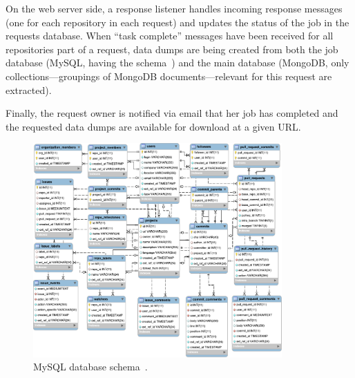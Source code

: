 On the web server side, a response listener handles incoming response messages (one for each repository
in each request)  and updates the status of the job in the requests database.
When ``task complete'' messages have been received for all repositories part of a request, data dumps
are being created from both the job database (MySQL, having the \ght schema~\cite{gousios2013ghtorent})
and the main \ght database (MongoDB, only collections---groupings of MongoDB documents---relevant for this
request are extracted).

Finally, the request owner is notified via email that her job has completed and the requested data dumps
are available for download at a given URL.

\begin{figure}[t]
\begin{center}
\includegraphics[width=0.85\textwidth]{figures/schema.pdf}
\caption{MySQL database schema~\cite{gousios2013ghtorent}.}
\label{fig:schema}
\end{center}
\end{figure}


